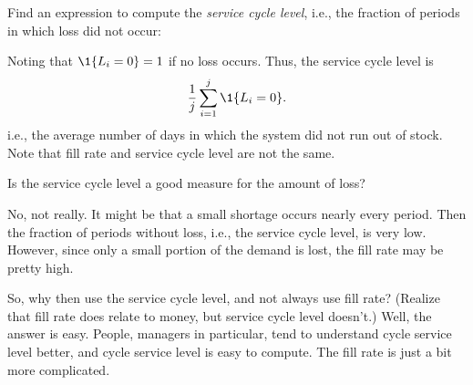 \begin{exercise}
Find an expression to compute  the \emph{service cycle level}, i.e., the fraction of periods in which loss did not occur:
\begin{solution}
Noting that $\1{L_i=0}=1$ if no loss occurs. Thus, the service cycle level is
\begin{equation*}
  \frac 1 j \sum_{i=1}^j \1{L_i=0}.
\end{equation*}
i.e., the average number of days in which the system did not run out of stock.
Note that fill rate and service cycle level are not the same. 
\end{solution}
\end{exercise}



\begin{exercise}
  Is the service cycle level a good measure for the  amount of loss?


  \begin{solution}
    No, not really. It might be that a small shortage occurs nearly
    every period. Then the fraction of periods without loss, i.e., the
    service cycle level, is very low. However, since only a small
    portion of the demand is lost, the fill rate may be pretty high. 

    So, why then use the service cycle level, and not always use
    fill rate? (Realize that fill rate does relate to money, but
    service cycle level doesn't.) Well, the answer is easy. People,
    managers in particular, tend to understand cycle service level
    better, and cycle service level is easy to compute. The fill rate
    is just a bit more complicated. 
  \end{solution}
\end{exercise}




\clearpage

